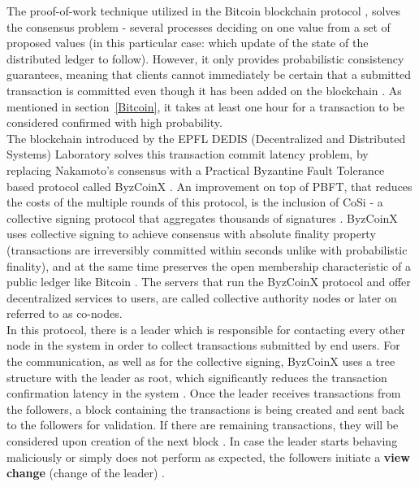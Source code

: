 The proof-of-work technique utilized in the Bitcoin blockchain protocol \cite{Bitcoin}, solves the consensus problem - several processes deciding on one value from a set of proposed values (in this particular case: which update of the state of the distributed ledger to follow). However, it only provides probabilistic consistency guarantees, meaning that clients cannot immediately be certain that a submitted transaction is committed even though it has been added on the blockchain \cite{ByzCoin}. As mentioned in section~\ref{Bitcoin}, it takes at least one hour for a transaction to be considered confirmed with high probability.\\
\newline
The blockchain introduced by the EPFL DEDIS (Decentralized and Distributed Systems) Laboratory solves this transaction commit latency problem, by replacing Nakamoto's consensus \cite{Bitcoin} with a Practical Byzantine Fault Tolerance \cite{PBFT} based protocol called ByzCoinX \cite{OmniLedger}. An improvement on top of PBFT, that reduces the costs of the multiple rounds of this protocol, is the inclusion of CoSi \cite{CoSi} - a collective signing protocol that aggregates thousands of signatures \cite{ByzCoin}. 
ByzCoinX uses collective signing to achieve consensus with absolute finality property (transactions are irreversibly committed within seconds unlike with probabilistic finality), and at the same time preserves the open membership characteristic of a public ledger like Bitcoin \cite{ByzCoin}.
\newline
The servers that run the ByzCoinX protocol and offer decentralized services to users, are called collective authority nodes or later on referred to as co-nodes.\\
\newline
In this protocol, there is a leader which is responsible for contacting every other node in the system in order to collect transactions submitted by end users. For the communication, as well as for the collective signing, ByzCoinX uses a tree structure with the leader as root, which significantly reduces the transaction confirmation latency in the system \cite{ByzCoin}.
\newline
Once the leader receives transactions from the followers, a block containing the transactions is being created and sent back to the followers for validation. If there are remaining transactions, they will be considered upon creation of the next block \cite{ByzCoin Impl}.
\newline
In case the leader starts behaving maliciously or simply does not perform as expected, the followers initiate a \textbf{view change} (change of the leader) \cite{ByzCoin Impl}.\\
